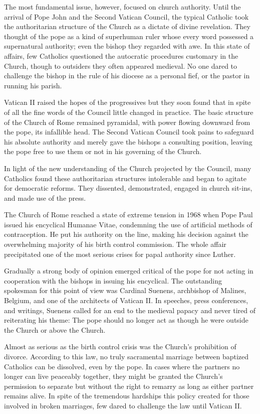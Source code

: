 The most fundamental issue, however, focused on church authority. Until the arrival of Pope John and
the Second Vatican Council, the typical Catholic took the authoritarian structure of the Church as a
dictate of divine revelation. They thought of the pope as a kind of superhuman ruler whose every
word possessed a supernatural authority; even the bishop they regarded with awe. In this state of
affairs, few Catholics questioned the autocratic procedures customary in the Church, though to
outsiders they often appeared medieval. No one dared to challenge the bishop in the rule of his
diocese as a personal fief, or the pastor in running his parish.

Vatican II raised the hopes of the progressives but they soon found that in spite of all the fine
words of the Council little changed in practice. The basic structure of the Church of Rome remained
pyramidal, with power flowing downward from the pope, its infallible head. The Second Vatican
Council took pains to safeguard his absolute authority and merely gave the bishops a consulting
position, leaving the pope free to use them or not in his governing of the Church.

In light of the new understanding of the Church projected by the Council, many Catholics found these
authoritarian structures intolerable and began to agitate for democratic reforms. They dissented,
demonstrated, engaged in church sit-ins, and made use of the press.

The Church of Rome reached a state of extreme tension in 1968 when Pope Paul issued his encyclical
Humanae Vitae, condemning the use of artificial methods of contraception. He put his authority on
the line, making his decision against the overwhelming majority of his birth control commission. The
whole affair precipitated one of the most serious crises for papal authority since Luther.

Gradually a strong body of opinion emerged critical of the pope for not acting in cooperation with
the bishops in issuing his encyclical. The outstanding spokesman for this point of view was Cardinal
Suenens, archbishop of Malines, Belgium, and one of the architects of Vatican II. In speeches, press
conferences, and writings, Suenens called for an end to the medieval papacy and never tired of
reiterating his theme: The pope should no longer act as though he were outside the Church or above
the Church.

Almost as serious as the birth control crisis was the Church’s prohibition of divorce. According to
this law, no truly sacramental marriage between baptized Catholics can be dissolved, even by the
pope. In cases where the partners no longer can live peaceably together, they might be granted the
Church’s permission to separate but without the right to remarry as long as either partner remains
alive. In spite of the tremendous hardships this policy created for those involved in broken
marriages, few dared to challenge the law until Vatican II.

